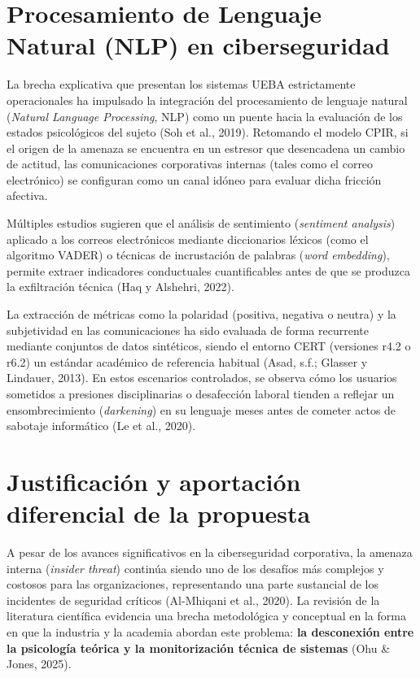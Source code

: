 \documentclass[IB]{TFUOC}%
\begin{document}
\section{Procesamiento de Lenguaje Natural (NLP) en ciberseguridad}
La brecha explicativa que presentan los sistemas UEBA estrictamente operacionales ha impulsado la integración del procesamiento de lenguaje natural (\textit{Natural Language Processing}, NLP) como un puente hacia la evaluación de los estados psicológicos del sujeto (Soh et al., 2019). Retomando el modelo CPIR, si el origen de la amenaza se encuentra en un estresor que desencadena un cambio de actitud, las comunicaciones corporativas internas (tales como el correo electrónico) se configuran como un canal idóneo para evaluar dicha fricción afectiva.

\medskip
\noindent Múltiples estudios sugieren que el análisis de sentimiento (\textit{sentiment analysis}) aplicado a los correos electrónicos mediante diccionarios léxicos (como el algoritmo VADER) o técnicas de incrustación de palabras (\textit{word embedding}), permite extraer indicadores conductuales cuantificables antes de que se produzca la exfiltración técnica (Haq y Alshehri, 2022).

\medskip
\noindent La extracción de métricas como la polaridad (positiva, negativa o neutra) y la subjetividad en las comunicaciones ha sido evaluada de forma recurrente mediante conjuntos de datos sintéticos, siendo el entorno CERT (versiones r4.2 o r6.2) un estándar académico de referencia habitual (Asad, s.f.; Glasser y Lindauer, 2013). En estos escenarios controlados, se observa cómo los usuarios sometidos a presiones disciplinarias o desafección laboral tienden a reflejar un ensombrecimiento (\textit{darkening}) en su lenguaje meses antes de cometer actos de sabotaje informático (Le et al., 2020).

\section{Justificación y aportación diferencial de la propuesta}
A pesar de los avances significativos en la ciberseguridad corporativa, la amenaza interna (\textit{insider threat}) continúa siendo uno de los desafíos más complejos y costosos para las organizaciones, representando una parte sustancial de los incidentes de seguridad críticos (Al-Mhiqani et al., 2020). La revisión de la literatura científica evidencia una brecha metodológica y conceptual en la forma en que la industria y la academia abordan este problema: \textbf{la desconexión entre la psicología teórica y la monitorización técnica de sistemas} (Ohu \& Jones, 2025).
\end{document}
